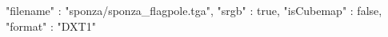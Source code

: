 { 
	"filename" : "sponza/sponza_flagpole.tga", 
	"srgb" : true,
	"isCubemap" : false,
	"format" : "DXT1"
}